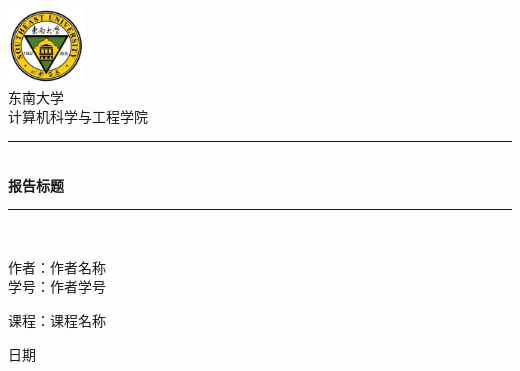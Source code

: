 \begin{titlepage}
    \begin{center}
    
    \includegraphics[width=0.15\textwidth]{assets/logo.jpg}\\[1cm]
    
    \textsc{\LARGE 东南大学} \\[1.5cm]
    \textsc{\Large 计算机科学与工程学院} \\[0.5cm]
    
    {\rule{\linewidth}{1mm}}\\[0.4cm]
    {\huge \bfseries 报告标题} \\[0.4cm]
    {\rule{\linewidth}{0.5mm}}\\[1.5cm]
    
    \begin{minipage}{0.4\textwidth}
    \begin{flushleft}
    \large
    作者：作者名称\\
    学号：作者学号
    \end{flushleft}
    \end{minipage}
    \begin{minipage}{0.4\textwidth}
    \end{minipage}
    \begin{minipage}{0.4\textwidth}
    \begin{flushright}
    \large
    课程：课程名称
    \end{flushright}
    \end{minipage}
    
    \vfill
    
    {\large 日期}
    
    \end{center}
\end{titlepage}
    